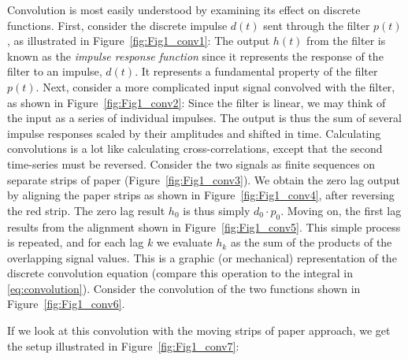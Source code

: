 	Convolution is most easily understood by examining its effect on discrete functions.  
First, consider the discrete impulse $d(t)$ sent through the filter $p(t)$, as illustrated in Figure~\ref{fig:Fig1_conv1}:
\noindent
The output $h(t)$ from the filter is 
known as the \emph{impulse response function} since it represents the response of the filter to an 
impulse, $d(t)$.  It represents a fundamental property of the filter $p(t)$.
Next, consider a more complicated input signal convolved with the filter, as shown in Figure~\ref{fig:Fig1_conv2}:
\noindent
Since the filter is linear, we may think of the input as a series of individual impulses. The output 
is thus the sum of several impulse responses scaled by their amplitudes and shifted in 
time.  Calculating convolutions is a lot like calculating cross-correlations, except 
that the second time-series must be reversed.  Consider the two signals as finite sequences on separate strips of 
paper (Figure~\ref{fig:Fig1_conv3}).
\noindent
We obtain the zero lag output by aligning the paper strips as shown in Figure~\ref{fig:Fig1_conv4},
after reversing the red strip.
\noindent
The zero lag result $h_0$ is thus simply $d_0 \cdot p_0$.  Moving on, the first lag results from the alignment shown in  Figure~\ref{fig:Fig1_conv5}.
\noindent
This simple process is repeated, and for each lag $k$ we evaluate $h_k$ as the sum of the products of the overlapping 
signal values.  This is a graphic (or mechanical) representation of the discrete convolution 
equation (compare this operation to the integral in \ref{eq:convolution}).
Consider the convolution of the two functions shown in Figure~\ref{fig:Fig1_conv6}.
 
\noindent
If we look at this convolution with the moving strips of paper approach, we get the setup illustrated in Figure~\ref{fig:Fig1_conv7}:
 
